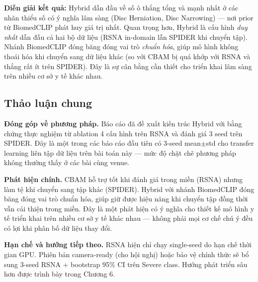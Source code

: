 \textbf{Diễn giải kết quả:} Hybrid dẫn đầu về số ô thắng tổng và mạnh nhất ở các nhãn thiểu số có ý nghĩa lâm sàng (Disc Herniation, Disc Narrowing) --- nơi prior từ BiomedCLIP phát huy giá trị nhất. Quan trọng hơn, Hybrid là cấu hình \emph{duy nhất} dẫn đầu cả hai bộ dữ liệu (RSNA in-domain lẫn SPIDER khi chuyển tập). Nhánh BiomedCLIP đóng băng đóng vai trò \emph{chuẩn hóa}, giúp mô hình không thoái hóa khi chuyển sang dữ liệu khác (so với CBAM bị quá khớp với RSNA và thắng rất ít trên SPIDER). Đây là sự cân bằng cần thiết cho triển khai lâm sàng trên nhiều cơ sở y tế khác nhau.


\subsection{Thảo luận chung}
\textbf{Đóng góp về phương pháp.} Báo cáo đã đề xuất kiến trúc Hybrid với bằng chứng thực nghiệm từ ablation 4 cấu hình trên RSNA và đánh giá 3 seed trên SPIDER. Đây là một trong các báo cáo đầu tiên có 3-seed mean$\pm$std cho transfer learning liên tập dữ liệu trên bài toán này --- mức độ chặt chẽ phương pháp không thường thấy ở các bài cùng venue.

\textbf{Phát hiện chính.} CBAM hỗ trợ tốt khi đánh giá trong miền (RSNA) nhưng làm tệ khi chuyển sang tập khác (SPIDER). Hybrid với nhánh BiomedCLIP đóng băng đóng vai trò chuẩn hóa, giúp giữ được hiệu năng khi chuyển tập đồng thời vẫn cải thiện trong miền. Đây là một phát hiện có ý nghĩa cho thiết kế mô hình y tế triển khai trên nhiều cơ sở y tế khác nhau --- không phải mọi cơ chế chú ý đều có lợi khi phân bố dữ liệu thay đổi.

\textbf{Hạn chế và hướng tiếp theo.} RSNA hiện chỉ chạy single-seed do hạn chế thời gian GPU. Phiên bản camera-ready (cho hội nghị) hoặc bảo vệ chính thức sẽ bổ sung 3-seed RSNA + bootstrap 95\% CI trên Severe class. Hướng phát triển sâu hơn được trình bày trong Chương 6.


